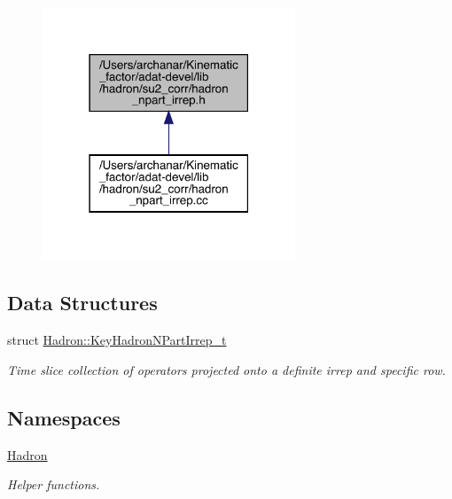 \begin{figure}[H]
\begin{center}
\leavevmode
\includegraphics[width=214pt]{d2/d43/adat-devel_2lib_2hadron_2su2__corr_2hadron__npart__irrep_8h__dep__incl}
\end{center}
\end{figure}
\subsection*{Data Structures}
\begin{DoxyCompactItemize}
\item 
struct \mbox{\hyperlink{structHadron_1_1KeyHadronNPartIrrep__t}{Hadron\+::\+Key\+Hadron\+N\+Part\+Irrep\+\_\+t}}
\begin{DoxyCompactList}\small\item\em Time slice collection of operators projected onto a definite irrep and specific row. \end{DoxyCompactList}\end{DoxyCompactItemize}
\subsection*{Namespaces}
\begin{DoxyCompactItemize}
\item 
 \mbox{\hyperlink{namespaceHadron}{Hadron}}
\begin{DoxyCompactList}\small\item\em Helper functions. \end{DoxyCompactList}\end{DoxyCompactItemize}
